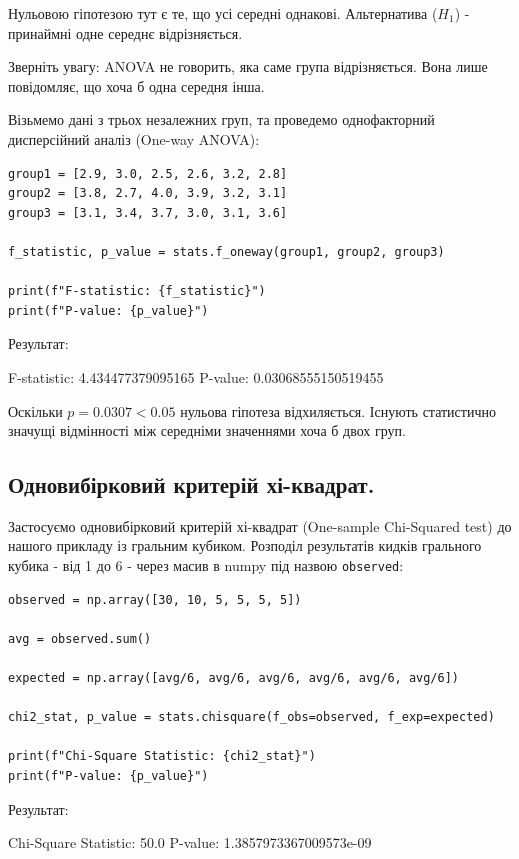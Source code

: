 Нульовою гіпотезою тут є те, що усі середні однакові. Альтернатива ($H_{1}$) - принаймні одне середнє відрізняється. 

 Зверніть увагу: ANOVA не говорить, яка саме група відрізняється. Вона лише повідомляє, що хоча б одна середня інша.

Візьмемо дані з трьох незалежних груп, та проведемо однофакторний дисперсійний аналіз (One-way ANOVA):

\begin{lstlisting}
group1 = [2.9, 3.0, 2.5, 2.6, 3.2, 2.8]
group2 = [3.8, 2.7, 4.0, 3.9, 3.2, 3.1]
group3 = [3.1, 3.4, 3.7, 3.0, 3.1, 3.6]

f_statistic, p_value = stats.f_oneway(group1, group2, group3)

print(f"F-statistic: {f_statistic}")
print(f"P-value: {p_value}")
\end{lstlisting}

Результат:

\begin{console}
F-statistic: 4.434477379095165
P-value: 0.03068555150519455
\end{console}

Оскільки $p = 0.0307 < 0.05$ нульова гіпотеза відхиляється. Існують статистично значущі відмінності між середніми значеннями хоча б двох груп.


\subsection{Одновибірковий критерій хі-квадрат.}

Застосуємо одновибірковий критерій хі-квадрат (One-sample Chi-Squared test) до нашого прикладу із гральним кубиком. Розподіл результатів кидків грального кубика - від 1 до 6 - через масив в numpy під назвою \verb|observed|:

\begin{lstlisting}
observed = np.array([30, 10, 5, 5, 5, 5])  

avg = observed.sum()

expected = np.array([avg/6, avg/6, avg/6, avg/6, avg/6, avg/6])

chi2_stat, p_value = stats.chisquare(f_obs=observed, f_exp=expected)

print(f"Chi-Square Statistic: {chi2_stat}")
print(f"P-value: {p_value}")
\end{lstlisting}

Результат:

\begin{console}
Chi-Square Statistic: 50.0
P-value: 1.3857973367009573e-09
\end{console}

